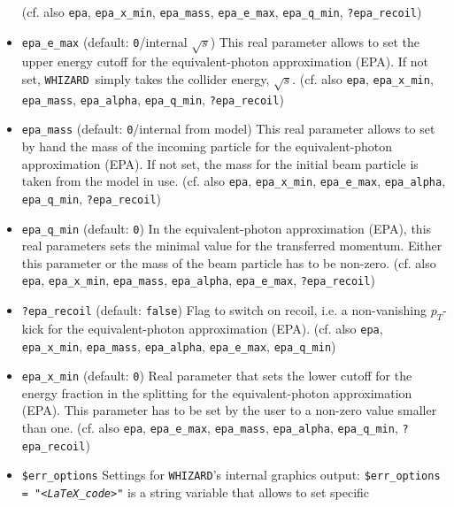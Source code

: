 \documentclass[12pt]{book}
\newcommand{\ttt}[1]{\texttt{#1}}
\newcommand{\whizard}{\texttt{WHIZARD}}
\begin{document}
\begin{itemize}
(cf. also \ttt{epa}, \ttt{epa\_x\_min}, \ttt{epa\_mass},
\ttt{epa\_e\_max}, \ttt{epa\_q\_min}, \ttt{?epa\_recoil})
\item
\ttt{epa\_e\_max} \qquad (default: \ttt{0}/internal $\sqrt{s}$)
\newline
This real parameter allows to set the upper energy cutoff for the
equivalent-photon approximation (EPA). If not set, \whizard\ simply
takes the collider energy, $\sqrt{s}$. (cf. also \ttt{epa},
\ttt{epa\_x\_min}, \ttt{epa\_mass}, \ttt{epa\_alpha},
\ttt{epa\_q\_min}, \ttt{?epa\_recoil}) 
\item
\ttt{epa\_mass} \qquad (default: \ttt{0}/internal from model) \newline 
This real parameter allows to set by hand the mass of the incoming
particle for the equivalent-photon approximation (EPA). If not
set, the mass for the initial beam particle is taken from the model in
use. (cf. also \ttt{epa}, \ttt{epa\_x\_min}, \ttt{epa\_e\_max},
\ttt{epa\_alpha}, \ttt{epa\_q\_min}, \ttt{?epa\_recoil}) 
\item
\ttt{epa\_q\_min} \qquad (default: \ttt{0})
\newline
In the equivalent-photon approximation (EPA), this real parameters
sets the minimal value for the transferred momentum. Either this
parameter or the mass of the beam particle has to be non-zero.
(cf. also \ttt{epa}, \ttt{epa\_x\_min}, \ttt{epa\_mass},
\ttt{epa\_alpha}, \ttt{epa\_e\_max}, \ttt{?epa\_recoil}) 
\item
\ttt{?epa\_recoil} \qquad (default: \ttt{false}) \newline
Flag to switch on recoil, i.e. a non-vanishing $p_T$-kick for the
equivalent-photon approximation (EPA). 
(cf. also \ttt{epa}, \ttt{epa\_x\_min}, \ttt{epa\_mass},
\ttt{epa\_alpha}, \ttt{epa\_e\_max}, \ttt{epa\_q\_min}) 
\item
\ttt{epa\_x\_min} \qquad (default: \ttt{0}) \newline
Real parameter that sets the lower cutoff for the energy fraction in
the splitting for the equivalent-photon approximation (EPA). This
parameter has to be set by the user to a non-zero value smaller than
one. (cf. also \ttt{epa}, \ttt{epa\_e\_max}, \ttt{epa\_mass},
\ttt{epa\_alpha}, \ttt{epa\_q\_min}, \ttt{?epa\_recoil}) 
\item
\ttt{\$err\_options} \newline
Settings for \whizard's internal graphics output: \ttt{\$err\_options
= "{\em <LaTeX\_code>}"} is a string variable that allows to set specific

\end{itemize}
\end{document}
